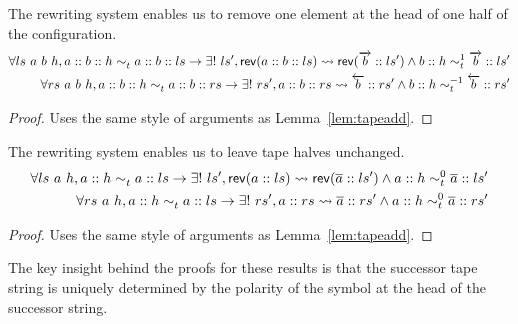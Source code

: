 \documentclass[a4paper,UKenglish,cleveref, autoref]{lipics-v2019}
\newcommand{\strent}{\rightsquigarrow}
\begin{document}
\begin{lemma}\label{lem:taperem}
  The rewriting system enables us to remove one element at the head of one half of the configuration.
  \begin{align*}
    \forall ls~a~b~h, a::b::h \reprt{} a::b::ls \rightarrow \exists!~ls', \rev{(a :: b :: ls)} \strent{} \rev{(\polpos{b} :: ls')} \land b :: h \reprt{1} \polpos{b} :: ls' \\
    \forall rs~a~b~h, a :: b :: h \reprt{} a :: b :: rs \rightarrow \exists!~rs', a :: b :: rs \strent{} \polneg{b} :: rs' \land b :: h \reprt{-1} \polneg{b} :: rs'
  \end{align*}
\end{lemma}
\begin{proof}
  Uses the same style of arguments as Lemma~\ref{lem:tapeadd}.
\end{proof}

\begin{lemma}\label{lem:tapeid}
  The rewriting system enables us to leave tape halves unchanged. 
  \begin{align*}
    \forall ls~a~h, a :: h \reprt{} a :: ls \rightarrow \exists !~ls', \rev{(a::ls)} \strent{} \rev{(\polneut{a} :: ls')} \land a :: h \reprt{0} \polneut{a} :: ls'\\
    \forall rs~a~h, a :: h \reprt{} a :: ls \rightarrow \exists !~rs', a :: rs \strent{} \polneut{a} :: rs' \land a :: h \reprt{0} \polneut{a} :: rs'
  \end{align*}
\end{lemma}
\begin{proof}
  Uses the same style of arguments as Lemma~\ref{lem:tapeadd}.
\end{proof}

The key insight behind the proofs for these results is that the successor tape string is uniquely determined by the polarity of the symbol at the head of the successor string. 
\end{document}
